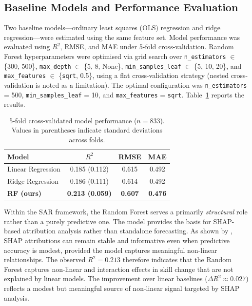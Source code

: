 \documentclass[3p,twocolumn,authoryear]{elsarticle}
\begin{document}
\subsection{Baseline Models and Performance Evaluation}

Two baseline models—ordinary least squares (OLS) regression and ridge
regression—were estimated using the same feature set.
Model performance was evaluated using $R^{2}$, RMSE, and MAE under 5-fold
cross-validation.
Random Forest hyperparameters were optimised via grid search over
\texttt{n\_estimators} $\in$ \{300, 500\}, \texttt{max\_depth}
$\in$ \{5, 8, None\}, \texttt{min\_samples\_leaf} $\in$ \{5, 10, 20\}, and
\texttt{max\_features} $\in$ \{\texttt{sqrt}, 0.5\}, using a flat
cross-validation strategy (nested cross-validation is noted as a
limitation).
The optimal configuration was \texttt{n\_estimators} = 500,
\texttt{min\_samples\_leaf} = 10, and
\texttt{max\_features} = \texttt{sqrt}.
Table~\ref{tab:baseline_performance} reports the results.

\begin{table}[htbp]
\centering
\caption{5-fold cross-validated model performance ($n = 833$).
Values in parentheses indicate standard deviations across folds.}
\label{tab:baseline_performance}
\begin{tabular}{@{}lccc@{}}
\toprule
\textbf{Model} & \textbf{$R^{2}$} & \textbf{RMSE} & \textbf{MAE} \\
\midrule
Linear Regression  & 0.185 (0.112) & 0.615 & 0.492 \\
Ridge Regression   & 0.186 (0.111) & 0.614 & 0.492 \\
\textbf{RF (ours)} & \textbf{0.213 (0.059)} & \textbf{0.607} & \textbf{0.476} \\
\bottomrule
\end{tabular}
\end{table}

Within the SAR framework, the Random Forest serves a primarily
\textit{structural} role rather than a purely predictive one.
The model provides the basis for SHAP-based attribution analysis rather
than standalone forecasting.
As shown by \citet{lundberg2020}, SHAP attributions can remain stable and
informative even when predictive accuracy is modest, provided the model
captures meaningful non-linear relationships.
The observed $R^{2} = 0.213$ therefore indicates that the Random Forest
captures non-linear and interaction effects in skill change that are not
explained by linear models.
The improvement over linear baselines
($\Delta R^{2} \approx 0.027$) reflects a modest but meaningful source of
non-linear signal targeted by SHAP analysis.
\end{document}
